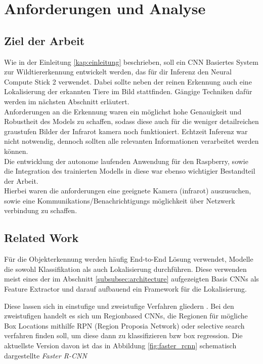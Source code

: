 \chapter{Anforderungen und Analyse}\label{kap:anforderunganalyse}

\section{Ziel der Arbeit}\label{sec:zielderarbeit}


Wie in der Einleitung \ref{kap:einleitung} beschrieben, soll 
ein CNN Basiertes System zur Wildtiererkennung entwickelt 
werden, das für dir Inferenz den Neural Compute Stick 2 verwendet.
Dabei sollte neben der reinen Erkennung auch eine Lokalisierung 
der erkannten Tiere im Bild stattfinden. Gängige Techniken dafür 
werden im nächsten Abschnitt erläutert.
\\
Anforderungen an die Erkennung waren ein möglichst hohe 
Genauigkeit und Robustheit des Models zu schaffen, sodass 
diese auch für die weniger detailreichen graustufen Bilder 
der Infrarot kamera noch funktioniert. Echtzeit Inferenz 
war nicht notwendig, dennoch sollten alle relevanten Informationen 
verarbeitet werden können.
\\
Die entwicklung der autonome laufenden Anwendung für den Raspberry, 
sowie die Integration des trainierten Modells in diese war ebenso 
wichtigier Bestandteil der Arbeit.
\\
Hierbei waren die anforderungen eine geeignete Kamera (infrarot) 
auszusuchen, sowie eine Kommunikations/Benachrichtigungs 
möglichkeit über Netzwerk verbindung zu schaffen.


\section{Related Work}\label{sec:related_work}

Für die Objekterkennung werden häufig End-to-End Lösung verwendet,
Modelle die sowohl Klassifikation als auch Lokalisierung 
durchführen.
Diese verwenden meist eines der im Abschnitt 
\ref{subsubsec:architecture} aufgezeigten Basis CNNs als  
Feature Extractor und darauf aufbauend ein Framework für die 
Lokalisierung. 


Diese lassen sich in einstufige und zweistufige Verfahren 
gliedern \cite{wengObjectDetectionPart2018}. Bei den zweistufigen
handelt es sich um Regionbased CNNs, die Regionen für
mögliche Box Locations mithilfe RPN (Region Proposia Network)
oder selective search verfahren finden soll, um diese dann
zu klassifizieren bzw box regression. Die aktuellste Version 
davon ist das in Abbildung \ref{fig:faster_rcnn} schematisch 
dargestellte \textit{Faster R-CNN} \cite{renFasterRCNNRealTime2016a}


